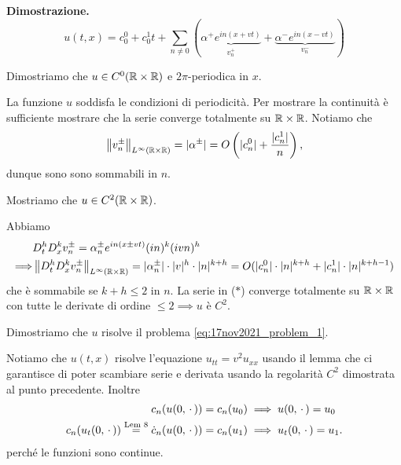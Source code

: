 \newpage

\textbf{Dimostrazione.}
$$
	u(t,x) = c_0^0 + c_0^1 t + \sum_{n \neq  0} 
	(
	\underbrace{\alpha^+ e^{in(x + vt)}}_{v^+_n} 
	+ 
	\underbrace{\alpha^- e^{in(x - vt)}}_{v^-_n}
	)
$$

Dimostriamo che $u \in C^0(\mathbb R \times \mathbb R)$ e $2\pi$-periodica in $x$. 

La funzione $u$ soddisfa le condizioni di periodicità. Per mostrare la continuità è sufficiente mostrare che la serie converge totalmente su $\mathbb R \times \mathbb R$. Notiamo che
$$
	\left\lVert v^\pm_n \right\rVert_{L^\infty(\mathbb R \times \mathbb R)} = |\alpha^\pm| = O\left( |c_n^0| + \frac{|c_n^1|}{n} \right),
$$
dunque sono sono sommabili in $n$.

Mostriamo che $u \in C^2(\mathbb R \times \mathbb R)$. 

Abbiamo 
%
\begin{align*}
	& D_t^h D_x^k v_n^\pm = \alpha^\pm_n e^{in(x \pm vt)} (in)^k (ivn)^h \\
	\Longrightarrow & \left\lVert D_t^h D_x^k v^\pm_n \right\rVert_{L^\infty(\mathbb R \times \mathbb R)} = |\alpha^\pm_n| \cdot |v|^h \cdot |n|^{k+h}
	= O(|c_n^0| \cdot |n|^{k+h} + |c_n^1| \cdot |n|^{k + h - 1}) 
\end{align*}
%
che è sommabile se $k + h \leq 2$ in $n$. La serie in ($*$) converge totalmente su $\mathbb R \times \mathbb R$ con tutte le derivate di ordine $\leq 2 \implies u$ è $C^2$.

Dimostriamo che $u$ risolve il problema \eqref{eq:17nov2021_problem_1}.


Notiamo che $u(t,x)$ risolve l'equazione $u_{tt} = v^2 u_{xx}$ usando il lemma che ci garantisce di poter scambiare serie e derivata usando la regolarità $C^2$ dimostrata al punto precedente.
Inoltre
\begin{align*}
	c_n(u(0, \,\cdot\,)) = c_n(u_0) & \implies u(0, \,\cdot\,) = u_0 \\
	c_n(u_t(0, \,\cdot\,)) \overset{\text{Lem 8}}{=} \dot c_n (u(0,\,\cdot\,)) = c_n(u_1) & \implies u_t(0, \,\cdot\,) = u_1.
\end{align*}
perché le funzioni sono continue.


